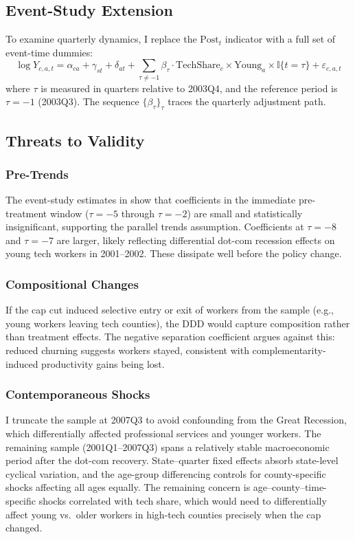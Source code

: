 \documentclass[12pt]{article}
\newcommand{\ind}{\mathbb{I}}
\begin{document}
\subsection{Event-Study Extension}

To examine quarterly dynamics, I replace the $\text{Post}_t$ indicator with a full set of event-time dummies:
\begin{equation}
\log Y_{c,a,t} = \alpha_{ca} + \gamma_{st} + \delta_{at} + \sum_{\tau \neq -1} \beta_\tau \cdot \text{TechShare}_c \times \text{Young}_a \times \ind\{t = \tau\} + \varepsilon_{c,a,t}
\label{eq:eventstudy}
\end{equation}
where $\tau$ is measured in quarters relative to 2003Q4, and the reference period is $\tau = -1$ (2003Q3). The sequence $\{\beta_\tau\}_\tau$ traces the quarterly adjustment path.

\subsection{Threats to Validity}

\subsubsection*{Pre-Trends} The event-study estimates in  show that coefficients in the immediate pre-treatment window ($\tau = -5$ through $\tau = -2$) are small and statistically insignificant, supporting the parallel trends assumption. Coefficients at $\tau = -8$ and $\tau = -7$ are larger, likely reflecting differential dot-com recession effects on young tech workers in 2001--2002. These dissipate well before the policy change.

\subsubsection*{Compositional Changes} If the cap cut induced selective entry or exit of workers from the sample (e.g., young workers leaving tech counties), the DDD would capture composition rather than treatment effects. The negative separation coefficient argues against this: reduced churning suggests workers stayed, consistent with complementarity-induced productivity gains being lost.

\subsubsection*{Contemporaneous Shocks} I truncate the sample at 2007Q3 to avoid confounding from the Great Recession, which differentially affected professional services and younger workers. The remaining sample (2001Q1--2007Q3) spans a relatively stable macroeconomic period after the dot-com recovery. State--quarter fixed effects absorb state-level cyclical variation, and the age-group differencing controls for county-specific shocks affecting all ages equally. The remaining concern is age--county--time-specific shocks correlated with tech share, which would need to differentially affect young vs.\ older workers in high-tech counties precisely when the cap changed.
\end{document}
